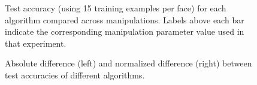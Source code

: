 \documentclass[pageno]{cos429}
\begin{document}
\begin{figure}[ht!]
    \qquad
    \caption{Test accuracy (using 15 training examples per face) for each algorithm compared across manipulations. Labels above each bar indicate the corresponding manipulation parameter value used in that experiment.}
    \label{fig:results_algorithms}
\end{figure}

\begin{figure}[ht!]
\centering
{}
\caption{Absolute difference (left) and normalized difference (right) between test accuracies of different algorithms.}
\label{fig:results_diff}
\end{figure}
\end{document}
